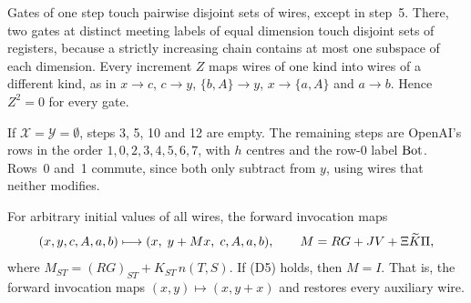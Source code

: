 Gates of one step touch pairwise disjoint sets of wires, except in step~5. There, two gates at distinct
meeting labels of equal dimension touch disjoint sets of registers, because a strictly increasing chain
contains at most one subspace of each dimension. Every increment $Z$ maps wires of one kind into wires
of a different kind, as in
$x\to c$, $c\to y$, $\{b,A\}\to y$, $x\to\{a,A\}$ and $a\to b$. Hence $Z^2=0$ for every gate.

\begin{remark}\label{col:rem:oairows}
If $\mathcal X=\mathcal Y=\emptyset$, steps 3, 5, 10 and 12 are empty. The remaining steps are OpenAI's
rows \cite[(2.3)]{oai} in the order $1,0,2,3,4,5,6,7$, with $h$ centres and the row-0 label $\mathrm{Bot}$.
Rows~0 and~1 commute, since both only subtract from $y$, using wires that neither modifies.
\end{remark}

\begin{lemma}\label{col:lem:scalar}
For arbitrary initial values of all wires, the forward invocation maps
\[
  (x,y,c,A,a,b)\longmapsto(x,\;y+Mx,\;c,A,a,b),\qquad M=RG+JV+\Xi\widetilde K\Pi ,
\]
where $M_{ST}=(RG)_{ST}+K_{ST}\,n(T,S)$. If (D5) holds, then $M=I$. That is, the forward invocation
maps $(x,y)\mapsto(x,y+x)$ and restores every auxiliary wire.
\end{lemma}

